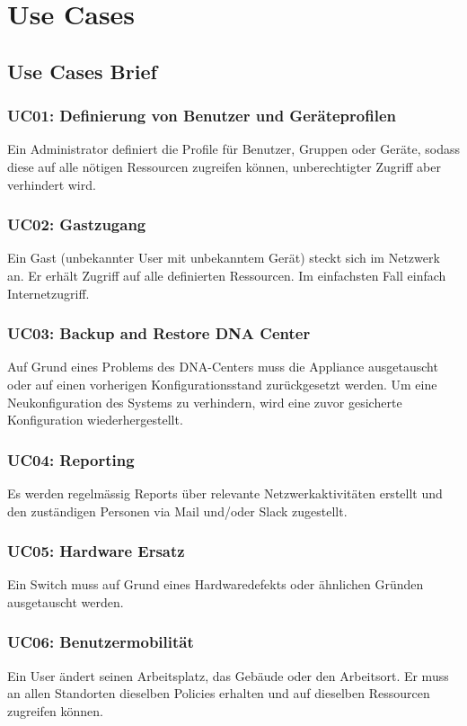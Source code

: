 \section{Use Cases}

\subsection{Use Cases Brief}
\subsubsection{UC01: Definierung von Benutzer und Geräteprofilen}
Ein Administrator definiert die Profile für Benutzer, Gruppen oder Geräte, sodass diese auf alle nötigen Ressourcen zugreifen können, unberechtigter Zugriff aber verhindert wird.

\subsubsection{UC02: Gastzugang}
Ein Gast (unbekannter User mit unbekanntem Gerät) steckt sich im Netzwerk an. Er erhält Zugriff auf alle definierten Ressourcen. Im einfachsten Fall einfach Internetzugriff.

\subsubsection{UC03: Backup and Restore DNA Center}
Auf Grund eines Problems des DNA-Centers muss die Appliance ausgetauscht oder auf einen vorherigen Konfigurationsstand zurückgesetzt werden. Um eine Neukonfiguration des Systems zu verhindern, wird eine zuvor gesicherte Konfiguration wiederhergestellt.

\subsubsection{UC04: Reporting}
Es werden regelmässig Reports über relevante Netzwerkaktivitäten erstellt und den zuständigen Personen via Mail und/oder Slack zugestellt.

\subsubsection{UC05: Hardware Ersatz}
Ein Switch muss auf Grund eines Hardwaredefekts oder ähnlichen Gründen ausgetauscht werden.

\subsubsection{UC06: Benutzermobilität}
Ein User ändert seinen Arbeitsplatz, das Gebäude oder den Arbeitsort. Er muss an allen Standorten dieselben Policies erhalten und auf dieselben Ressourcen zugreifen können.

